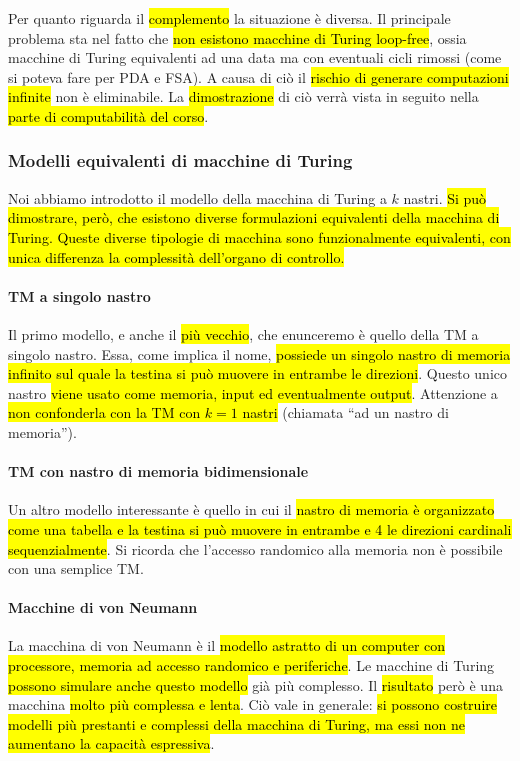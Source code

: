 \documentclass[a4paper,11pt,twoside]{article}
\theoremstyle{plain}
\theoremstyle{definition}
\theoremstyle{remark}
\begin{document}
Per quanto riguarda il \hl{complemento} la situazione è diversa. Il principale
problema sta nel fatto che \hl{non esistono macchine di Turing loop-free}, ossia
macchine di Turing equivalenti ad una data ma con eventuali cicli rimossi (come
si poteva fare per PDA e FSA). A causa di ciò il \hl{rischio di generare
computazioni infinite} non è eliminabile. La \hl{dimostrazione} di ciò verrà
vista in seguito nella \hl{parte di computabilità del corso}.

\subsubsection{Modelli equivalenti di macchine di Turing}\label{sec:modelli-mt}

Noi abbiamo introdotto il modello della macchina di Turing a $k$ nastri. \hl{Si
può dimostrare, però, che esistono diverse formulazioni equivalenti della
macchina di Turing. Queste diverse tipologie di macchina sono funzionalmente
equivalenti, con unica differenza la complessità dell'organo di controllo.}

\paragraph{TM a singolo nastro} Il primo modello, e anche il \hl{più
vecchio}, che enunceremo è quello della TM a singolo nastro. Essa, come implica
il nome, \hl{possiede un singolo nastro di memoria infinito sul quale la testina
si può muovere in entrambe le direzioni}. Questo unico nastro \hl{viene usato
come memoria, input ed eventualmente output}. Attenzione a \hl{non confonderla
con la TM con $k=1$ nastri} (chiamata ``ad un nastro di memoria'').

\paragraph{TM con nastro di memoria bidimensionale} Un altro modello
interessante è quello in cui il \hl{nastro di memoria è organizzato come una
tabella e la testina si può muovere in entrambe e 4 le direzioni cardinali
sequenzialmente}. Si ricorda che l'accesso randomico alla memoria non è
possibile con una semplice TM\@.

\paragraph{Macchine di von Neumann} La macchina di von Neumann è il
\hl{modello astratto di un computer con processore, memoria ad accesso randomico
e periferiche}. Le macchine di Turing \hl{possono simulare anche questo modello}
già più complesso. Il \hl{risultato} però è una macchina \hl{molto più complessa
e lenta}. Ciò vale in generale: \hl{si possono costruire modelli più prestanti e
complessi della macchina di Turing, ma essi non ne aumentano la capacità
espressiva}.
\end{document}
